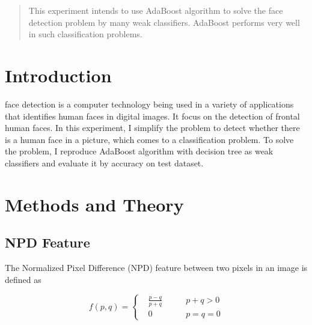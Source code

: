 \documentclass[journal, a4paper]{IEEEtran}
\begin{document}
\begin{abstract}
    This experiment intends to use AdaBoost algorithm to solve the face detection problem by many weak classifiers. AdaBoost performs very well in such classification problems.
\end{abstract}

\section{Introduction}
     face detection is a computer technology being used in a variety of applications that identifies human faces in digital images. It focus on the detection of frontal human faces. In this experiment, I simplify the problem to detect whether there is a human face in a picture, which comes to a classification problem. To solve the problem, I reproduce AdaBoost algorithm with decision tree as weak classifiers and evaluate it by accuracy on test dataset.

\section{Methods and Theory}
\subsection{NPD Feature}

The Normalized Pixel Difference (NPD) feature between two pixels in an image is defined as 

\begin{equation}\label{eq:npd-definition}
    f(p, q) = \left\{
    \begin{aligned}
        & \frac{p-q}{p+q} & \qquad p+q>0\\
        & 0 & \qquad p=q=0
    \end{aligned}
    \right.
\end{equation}
\end{document}
